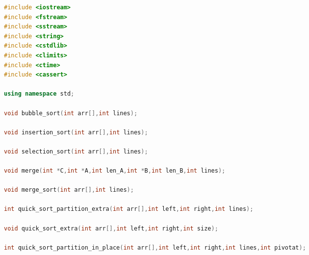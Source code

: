 \documentclass{article}
\begin{document}
\begin{spacing}{2.0}
\begin{lstlisting}[language=c++]
#include <iostream>
#include <fstream>
#include <sstream>
#include <string>
#include <cstdlib>
#include <climits>
#include <ctime>
#include <cassert>

using namespace std;

void bubble_sort(int arr[],int lines);

void insertion_sort(int arr[],int lines);

void selection_sort(int arr[],int lines);

void merge(int *C,int *A,int len_A,int *B,int len_B,int lines);

void merge_sort(int arr[],int lines);

int quick_sort_partition_extra(int arr[],int left,int right,int lines);

void quick_sort_extra(int arr[],int left,int right,int size);

int quick_sort_partition_in_place(int arr[],int left,int right,int lines,int pivotat);


\end{lstlisting}
\end{spacing}
\end{document}

